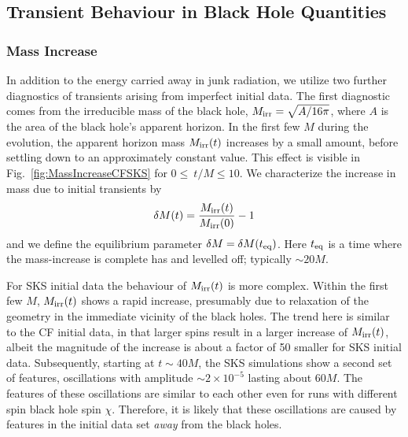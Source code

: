 \subsection{Transient Behaviour in Black Hole Quantities}

\subsubsection{Mass Increase}
In addition to the energy carried away in junk radiation, we utilize two further
diagnostics of transients arising from imperfect initial data.
The first diagnostic comes from the irreducible
mass of the black hole, $M_{\rm irr} = \sqrt{A/16\pi}$, where $A$
is the area of the black hole's apparent horizon. In the first few $M$ during the evolution, the apparent horizon mass
$M_{\rm irr}(t)$ increases by a small amount, before settling down to
an approximately constant value. This effect is visible in Fig.~\ref{fig:MassIncreaseCFSKS} for $0\le~t/M\le10$.
We characterize the increase in mass due to initial transients by 
\begin{equation}
\delta M(t)=\frac{M_{\rm irr}(t)}{M_{\rm irr}(0)}-1
\end{equation}
and we define the equilibrium parameter $\delta M = \delta M(t_{\rm eq})$.
Here $t_{\rm eq}$ is a time where the mass-increase is complete has and
levelled off; typically $\sim20M$. 

For SKS initial data the behaviour of $M_{\rm irr}(t)$ is more
  complex.  Within the first few $M$, $M_{\rm irr}(t)$ shows a rapid
  increase, presumably due to relaxation of the geometry
  in the immediate vicinity of the black holes.  The trend here is
  similar to the CF initial data, in that larger spins result in a
  larger increase of $M_{\rm irr}(t)$, albeit the magnitude of the
  increase is about a factor of 50 smaller for SKS initial data.
  Subsequently, starting at $t\sim 40M$, the SKS simulations show a second
  set of features, oscillations with amplitude $\sim 2\times 10^{-5}$ lasting about
  $60M$.  The features of these oscillations are similar to each other
  even for runs with different spin black hole spin $\chi$.  Therefore, it is
  likely that these oscillations are caused by features in the initial
  data set {\it away} from the black holes.


